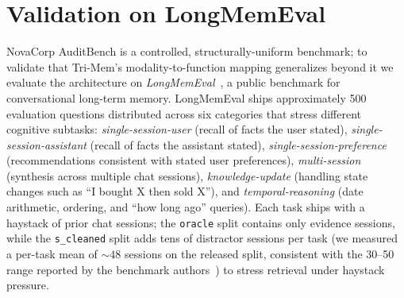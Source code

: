 \documentclass[conference]{IEEEtran}
\begin{document}
\section{Validation on LongMemEval}
\label{sec:longmem}

NovaCorp AuditBench is a controlled, structurally-uniform benchmark; to validate that Tri-Mem's modality-to-function mapping generalizes beyond it we evaluate the architecture on \textit{LongMemEval}~\cite{longmemeval2024,longmemevalrepo}, a public benchmark for conversational long-term memory. LongMemEval ships approximately 500 evaluation questions distributed across six categories that stress different cognitive subtasks: \textit{single-session-user} (recall of facts the user stated), \textit{single-session-assistant} (recall of facts the assistant stated), \textit{single-session-preference} (recommendations consistent with stated user preferences), \textit{multi-session} (synthesis across multiple chat sessions), \textit{knowledge-update} (handling state changes such as ``I bought X then sold X''), and \textit{temporal-reasoning} (date arithmetic, ordering, and ``how long ago'' queries). Each task ships with a haystack of prior chat sessions; the \texttt{oracle} split contains only evidence sessions, while the \texttt{s\_cleaned} split adds tens of distractor sessions per task (we measured a per-task mean of ${\sim}48$ sessions on the released split, consistent with the 30--50 range reported by the benchmark authors~\cite{longmemevalrepo}) to stress retrieval under haystack pressure.
\end{document}
